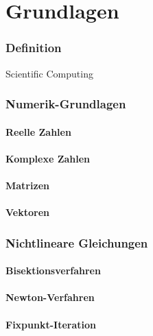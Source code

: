 \documentclass[a4paper, 12pt]{article}
\begin{document}
\tableofcontents
\pagebreak



\part{Grundlagen}



\section{Definition}
Scientific Computing



\section{Numerik-Grundlagen}


\subsection{Reelle Zahlen}


\subsection{Komplexe Zahlen}


\subsection{Matrizen}


\subsection{Vektoren}



\section{Nichtlineare Gleichungen}


\subsection{Bisektionsverfahren}


\subsection{Newton-Verfahren}


\subsection{Fixpunkt-Iteration}
\end{document}
